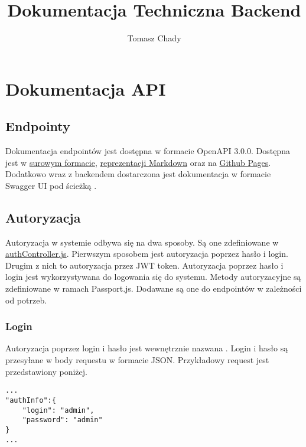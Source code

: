 \documentclass{documentation}
\title{Dokumentacja Techniczna Backend}
\author{Tomasz Chady}
\begin{document}
\maketitle

\tableofcontents

\newpage

\section{Dokumentacja API}

\subsection{Endpointy}

Dokumentacja endpointów jest dostępna w formacie OpenAPI 3.0.0.
Dostępna jest w \href{https://github.com/Stanlee77/ASSASSIN/blob/master/backend/openapi.yaml}{surowym formacie}, \href{https://github.com/Stanlee77/ASSASSIN/blob/master/doc/openapi.md}{reprezentacji Markdown} oraz na \href{https://stanlee77.github.io/ASSASSIN/openapi.html}{Github Pages}.
Dodatkowo wraz z backendem dostarczona jest dokumentacja w formacie Swagger UI pod ścieżką \codeword{\docs}.

\subsection{Autoryzacja}

Autoryzacja w systemie odbywa się na dwa sposoby.
Są one zdefiniowane w \href{https://github.com/Stanlee77/ASSASSIN/blob/master/backend/controllers/authController.js}{authController.js}.
Pierwszym sposobem jest autoryzacja poprzez hasło i login.
Drugim z nich to autoryzacja przez JWT token.
Autoryzacja poprzez hasło i login jest wykorzystywana do logowania się do systemu.
Metody autoryzacyjne są zdefiniowane w ramach Passport.js.
Dodawane są one do endpointów w zależności od potrzeb.

\subsubsection{Login}

Autoryzacja poprzez login i hasło jest wewnętrznie nazwana .
Login i hasło są przesyłane w body requestu w formacie JSON.
Przykładowy request jest przedstawiony poniżej.

\begin{lstlisting}
...
"authInfo":{
    "login": "admin",
    "password": "admin"
}
...
\end{lstlisting}
\end{document}
